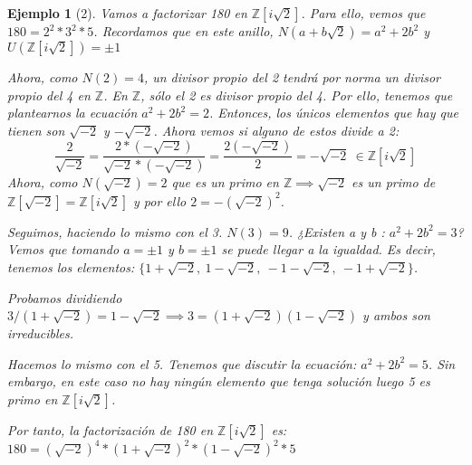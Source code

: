 \documentclass[11pt, a4paper, titlepage]{article}
\providecommand{\ent}{\mathbb{Z}}
\theoremstyle{theorem-style}
\theoremstyle{definition-style}
\theoremstyle{remark-style}
\theoremstyle{example-style}
\newtheorem*{ejemplo}{Ejemplo}
\begin{document}
\begin{ejemplo}[2]
	Vamos a factorizar 180 en $\ent[i\sqrt2]$. Para ello, vemos que $180 = 2^2 * 3^2 * 5$. Recordamos que en este anillo, $N(a+b\sqrt2) = a^2 +2b^2$ y $U(\ent[i\sqrt2]) = \pm 1$
	
	Ahora, como $N(2) = 4$, un divisor propio del 2 tendrá por norma un divisor propio del 4 en $\ent$. En $\ent$, sólo el 2 es divisor propio del 4. Por ello, tenemos que plantearnos la ecuación $a^2+2b^2 = 2$. Entonces, los únicos elementos que hay que tienen son $\sqrt{-2}$ y $-\sqrt{-2}$. 
	Ahora vemos si alguno de estos divide a 2:
	\[
	\frac{2}{\sqrt{-2}} =  \frac{2*(-\sqrt{-2})}{\sqrt{-2}*(-\sqrt{-2})}= \frac{2(-\sqrt{-2})}{2} = -\sqrt{-2} \ \in \ent[i\sqrt2]
	\]
	Ahora, como $N(\sqrt{-2})=2$ que es un primo en $\ent \implies \sqrt{-2}$ es un primo de $\ent[\sqrt{-2}] = \ent[i\sqrt2]$ y por ello $2=-(\sqrt{-2})^2$.
	
	Seguimos, haciendo lo mismo con el 3. $N(3) = 9$. ¿Existen a y b : $a^2 + 2b^2 = 3$? Vemos que tomando $a=\pm 1$ y $b=\pm1$ se puede llegar a la igualdad. Es decir, tenemos los elementos: $\{1+\sqrt{-2}, \ 1-\sqrt{-2}, \ -1-\sqrt{-2}, \ - 1 + \sqrt{-2}\}$.
	
	Probamos dividiendo $3/(1+\sqrt{-2}) = 1 - \sqrt{-2}\implies 3 = (1+\sqrt{-2})(1-\sqrt{-2})$ y ambos son irreducibles.
	
	Hacemos lo mismo con el 5. Tenemos que discutir la ecuación: $a^2+2b^2 = 5$. Sin embargo, en este caso no hay ningún elemento que tenga solución luego 5 es primo en $\ent[i\sqrt2]$.
	
	Por tanto, la factorización de 180 en $\ent[i\sqrt2]$ es: $180 = (\sqrt{-2})^4*(1+\sqrt{-2})^2*(1-\sqrt{-2})^2*5$
\end{ejemplo}
\end{document}
